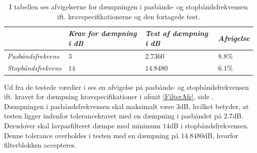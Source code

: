 \begin{table}[H]
	\centering
	\begin{tabular}{|l|l|l|l|}
		\cline{2-4} \multicolumn{1}{l|}{}
		& \textit{Krav for dæmpning i dB} 	& \textit{Test af dæmpning i dB}  &\textit{Afvigelse} \\ \hline
		\textit{Pasbåndsfrekvens} & $3$	& $2.7360$	    & $8.8\%$ \\ \hline
		\textit{Stopbåndsfrekvens} & $14$    & $14.8480$    & $6.1\%$  \\ \hline
	\end{tabular}
	\caption{I tabellen ses afvigelserne for dæmpningen i pasbånds- og stopbåndsfrekvensen ift. kravspecifikationerne og den fortagede test.}
	\label{Tab:Tolerance}
\end{table}
\noindent Ud fra de testede værdier i  ses en afvigelse på pasbånds- og stopbåndsfrekvensen ift. kravet for dæmpning kravspecifikationer i afsnit \ref{FilterAfs}, side \pageref{FilterAfs}. Dæmpningen i pasbåndsfrekvensen skal maksimalt være $3$dB, hvilket betyder, at testen ligger indenfor tolerancekravet med en dæmpning i pasbåndet på $2.7$dB. Derudover skal lavpasfilteret dæmpe med minimum $14$dB i stopbåndsfrekvensen. Denne tolerance overholdes i testen med en dæmpning på $14.8480$dB, hvorfor filterblokken accepteres.\\

